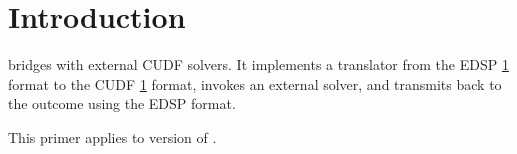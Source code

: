 
\section{Introduction}
\aptcudf{} bridges \aptget{} with external CUDF solvers. It implements
a translator from the EDSP \ref{} format to the CUDF \ref{}
format, invokes an external solver, and transmits back to \aptget{}
the outcome using the EDSP format.

This primer applies to version \version{} of \aptcudf.
